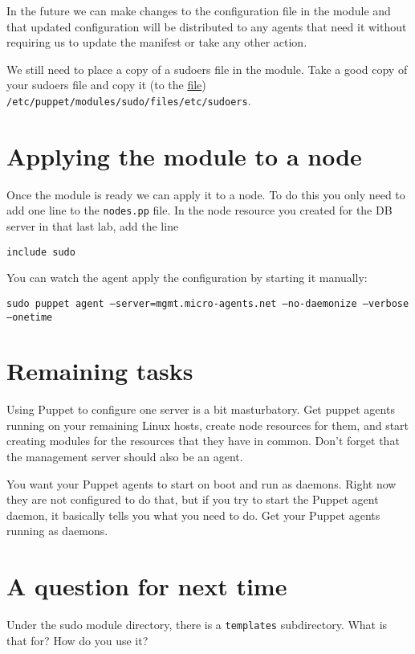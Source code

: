 \documentclass{article}   	%
\begin{document}
In the future we can make changes to the configuration file in the module and that updated configuration will be distributed to any agents that need it without requiring us to update the manifest or take any other action.

We still need to place a copy of a sudoers file in the module.  Take a good copy of your sudoers file and copy it (to the \underline{file}) \texttt{/etc/puppet/modules/sudo/files/etc/sudoers}.

\section*{Applying the module to a node}
Once the module is ready we can apply it to a node.  To do this you only need to add one line to the \texttt{nodes.pp} file.  In the node resource you created for the DB server in that last lab, add the line

\texttt{include sudo}

You can watch the agent apply the configuration by starting it manually:

\texttt{sudo puppet agent --server=mgmt.micro-agents.net --no-daemonize --verbose --onetime}

\section*{Remaining tasks}
Using Puppet to configure one server is a bit masturbatory.  Get puppet agents running on your remaining Linux hosts, create node resources for them, and start creating modules for the resources that they have in common.  Don't forget that the management server should also be an agent.

You want your Puppet agents to start on boot and run as daemons.  Right now they are not configured to do that, but if you try to start the Puppet agent daemon, it basically tells you what you need to do.  Get your Puppet agents running as daemons. 

\section*{A question for next time}
Under the sudo module directory, there is a \texttt{templates} subdirectory.  What is that for?  How do you use it?
\end{document}
